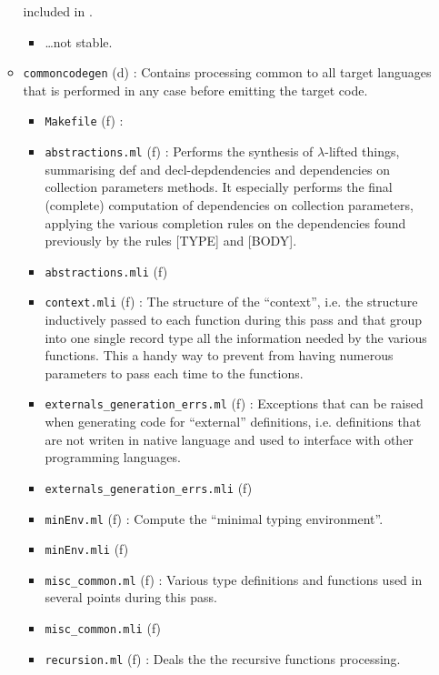 \begin{itemize}
\begin{itemize}
        included in \focalize.
        \begin{itemize}
        \item \ldots not stable.
        \end{itemize}
      \item {\tt commoncodegen} (d) : Contains processing common to
        all target languages that is performed in any case before
        emitting the target code.
        \begin{itemize}
        \item {\tt Makefile} (f) : 
        \item {\tt abstractions.ml} (f) : Performs the synthesis of
          $\lambda$-lifted things, summarising def and
          decl-depdendencies and dependencies on collection
          parameters methods. It especially performs the final
          (complete) computation of dependencies on collection
          parameters, applying the various completion rules on the
          dependencies found previously by the rules [TYPE] and
          [BODY].
        \item {\tt abstractions.mli} (f)
        \item {\tt context.mli} (f) : The structure of the
          ``context'', i.e. the structure inductively passed to each
          function during this pass and that group into one single
          record type all the information needed by the various
          functions. This a handy way to prevent from having numerous
          parameters to pass each time to the functions.
        \item {\tt externals\_generation\_errs.ml} (f) : Exceptions
          that can be raised when generating code for ``external''
          definitions, i.e. definitions that are not writen in native
          \focalize language and used to interface with other
          programming languages.
        \item {\tt externals\_generation\_errs.mli} (f)
        \item {\tt minEnv.ml} (f) : Compute the ``\coq minimal typing
          environment''.
        \item {\tt minEnv.mli} (f)
        \item {\tt misc\_common.ml} (f) : Various type definitions and
          functions used in several points during this pass.
        \item {\tt misc\_common.mli} (f)
        \item {\tt recursion.ml} (f) : Deals the the recursive
          functions processing.

\end{itemize}
\end{itemize}
\end{itemize}
